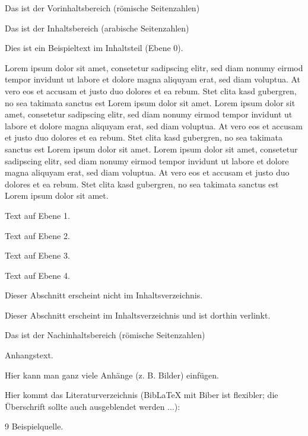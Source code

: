 \documentclass[12pt,a4paper]{article}
\begin{document}
\begin{PreContent}
	Das ist der Vorinhaltsbereich (römische Seitenzahlen)

	\tableofcontents
\end{PreContent}

\begin{Content}
	Das ist der Inhaltsbereich (arabische Seitenzahlen)

	Dies ist ein Beispieltext im Inhaltsteil (Ebene 0).

	Lorem ipsum dolor sit amet, consetetur sadipscing elitr, sed diam nonumy eirmod tempor invidunt ut labore et dolore magna aliquyam erat, sed diam voluptua. At vero eos et accusam et justo duo dolores et ea rebum. Stet clita kasd gubergren, no sea takimata sanctus est Lorem ipsum dolor sit amet. Lorem ipsum dolor sit amet, consetetur sadipscing elitr, sed diam nonumy eirmod tempor invidunt ut labore et dolore magna aliquyam erat, sed diam voluptua. At vero eos et accusam et justo duo dolores et ea rebum. Stet clita kasd gubergren, no sea takimata sanctus est Lorem ipsum dolor sit amet. Lorem ipsum dolor sit amet, consetetur sadipscing elitr, sed diam nonumy eirmod tempor invidunt ut labore et dolore magna aliquyam erat, sed diam voluptua. At vero eos et accusam et justo duo dolores et ea rebum. Stet clita kasd gubergren, no sea takimata sanctus est Lorem ipsum dolor sit amet.

	Text auf Ebene 1.

	Text auf Ebene 2.

	Text auf Ebene 3.

	Text auf Ebene 4.

	Dieser Abschnitt erscheint nicht im Inhaltsverzeichnis.

	Dieser Abschnitt erscheint im Inhaltsverzeichnis und ist dorthin verlinkt.
\end{Content}

\begin{PostContent}
	Das ist der Nachinhaltsbereich (römische Seitenzahlen)

	Anhangstext.

	Hier kann man ganz viele Anhänge (z. B. Bilder) einfügen.


	Hier kommt das Literaturverzeichnis (BibLaTeX mit Biber ist flexibler; die Überschrift sollte auch ausgeblendet werden ...):

	\begin{thebibliography}{9}
		 Beispielquelle.
	\end{thebibliography}
\end{PostContent}
\end{document}
